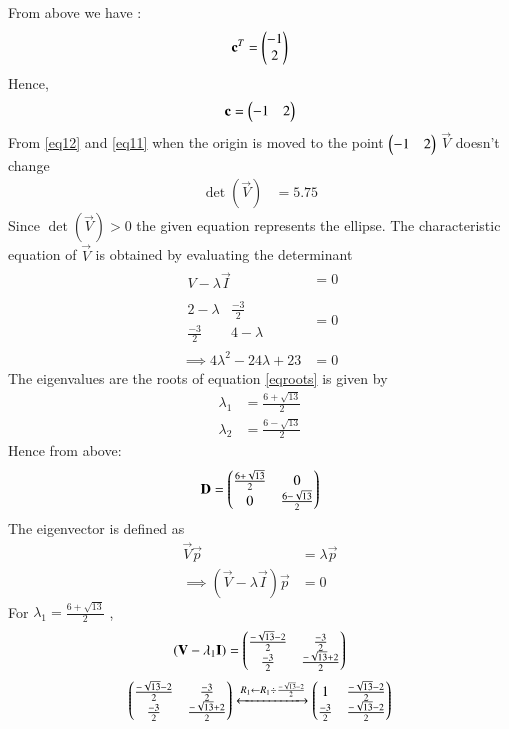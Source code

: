 \documentclass[journal,12pt,twocolumn]{IEEEtran}
\begin{document}
From above we have :
\begin{align}
 \mathbf{c}^T=
 \begin{pmatrix}
 -1\\2
 \end{pmatrix}
\end{align}
Hence,
\begin{align}
 \mathbf c=
\begin{pmatrix}
-1 &2\end{pmatrix}
\end{align}
From \eqref{eq12} and \eqref{eq11} when the origin is moved to the point  $\begin{pmatrix}-1 &2\end{pmatrix}$  $\vec{V}$ doesn't change
\begin{align}
    \det(\vec{V})&=5.75
\end{align}
Since $\det(\vec{V})>0$ the given equation represents the ellipse.
The characteristic equation of $\vec{V}$ is obtained by evaluating the determinant 
\begin{align}
       \begin{array}{|c|}
V-\lambda\vec{I}
\end{array}&=0\\
   \begin{array}{|cc|}
2-\lambda & \frac{-3}{2} \\ \frac{-3}{2} & 4-\lambda
\end{array}&=0\\
\implies 4\lambda^2-24\lambda+23&=0\label{eqroots}
\end{align}
The eigenvalues are the roots of equation \ref{eqroots} is given by 
\begin{align}
    \lambda_1&=\frac{6+\sqrt{13}}{2}\label{eqeig1}\\
    \lambda_2&=\frac{6-\sqrt{13}}{2}\label{eqeig2}
\end{align}
Hence from above:
\begin{align}\label{d}
    \mathbf{D}=
    \begin{pmatrix}
    \frac{6+\sqrt{13}}{2} & 0\\
     0 &\frac{6-\sqrt{13}}{2}
    \end{pmatrix}
\end{align}
The eigenvector  is defined as 
\begin{align}
    \vec{V}\vec{p}&=\lambda\vec{p}\\
    \implies (\vec{V}-\lambda\vec{I})\vec{p}&=0\label{eqev}
\end{align}
For $\lambda_1=\frac{6+\sqrt{13}}{2}$ ,
\begin{align}
    (\mathbf{V}-\lambda_1\mathbf{I})=\begin{pmatrix}\frac{-\sqrt{13}-2}{2} & \frac{-3}{2} \\\frac{-3}{2} & \frac{-\sqrt{13}+2}{2}\end{pmatrix}
\end{align}
\begin{align}
   \begin{pmatrix}\frac{-\sqrt{13}-2}{2} & \frac{-3}{2} \\\frac{-3}{2} & \frac{-\sqrt{13}+2}{2}\end{pmatrix}
    \xleftrightarrow[]{R_1 \leftarrow R_1\div\frac{-\sqrt{13}-2}{2}}
    \begin{pmatrix}
    1 &\frac{-\sqrt{13}-2}{2}\\
    \frac{-3}{2} & \frac{-\sqrt{13}-2}{2}
    \end{pmatrix}
\end{align}
\end{document}
